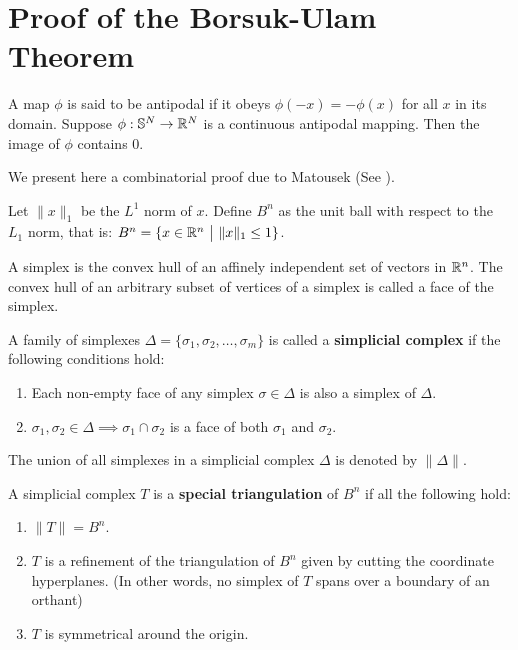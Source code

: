 
\chapter{Proof of the Borsuk-Ulam Theorem}
    \begin{theorem}
        A map $\phi$ is said to be antipodal if it obeys $\phi (-x) = -\phi(x)$ for all $x$ in its domain. Suppose $\phi: \mathbb S^N \to \mathbb R^N$ is a continuous antipodal mapping. 
        Then the image of $\phi$ contains 0. \label{appendix:Borsuk-Ulam}
    \end{theorem}
We present here a combinatorial proof due to Matousek (See \cite{matouvsek2003using}).

Let $\|x\|_1$ be the $L^1$ norm of $x$. Define $B^n$ as the unit ball with respect to the $L_1$ norm, 
that is: $B^n = \{x\in \RR^n \ \big | \ \|x\|_1 \leq 1 \}$.
\begin{definition}
    A simplex is the convex hull of an affinely independent set of vectors in $\mathbb R^n$. The convex hull of an arbitrary subset of vertices of a simplex is called a face of the simplex.

    A family of simplexes $\Delta = \{\sigma_1,\sigma_2, \dots, \sigma_m\}$ is called a \textbf{simplicial complex} if the following conditions hold:
    \begin{enumerate}
        \item Each non-empty face of any simplex $\sigma \in \Delta$ is also a simplex of $\Delta$.
        \item $\sigma_1, \sigma_2 \in \Delta \implies \sigma_1 \cap \sigma_2$ is a face of both $\sigma_1$ and $\sigma_2$.
    \end{enumerate}
    The union of all simplexes in a simplicial complex $\Delta$ is denoted by $\| \Delta \|$.
\end{definition}


A simplicial complex $T$ is a \textbf{special triangulation} of $B^n$ if all the following hold:
\begin{enumerate}
    \item $\|T\| = B^n$.
    \item $T$ is a refinement of the triangulation of $B^n$ given by cutting the coordinate hyperplanes. (In other words, no simplex of $T$ spans over a boundary of an orthant)
    \item $T$ is symmetrical around the origin.
\end{enumerate}

